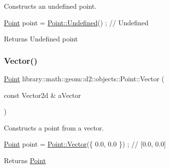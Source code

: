 Constructs an undefined point. 


\begin{DoxyCode}
\hyperlink{classlibrary_1_1math_1_1geom_1_1d2_1_1objects_1_1_point_a4998aefdf80bdfd967f21d49fa050398}{Point} point = \hyperlink{classlibrary_1_1math_1_1geom_1_1d2_1_1objects_1_1_point_a110a5bba9399abc5408f6c34306040c6}{Point::Undefined}() ; \textcolor{comment}{// Undefined}
\end{DoxyCode}


\begin{DoxyReturn}{Returns}
Undefined point 
\end{DoxyReturn}
\mbox{\label{classlibrary_1_1math_1_1geom_1_1d2_1_1objects_1_1_point_a3b656a68cb1f75901dc44e109e6eca58}} 
\subsubsection{\texorpdfstring{Vector()}{Vector()}}
{\footnotesize\ttfamily \hyperlink{classlibrary_1_1math_1_1geom_1_1d2_1_1objects_1_1_point}{Point} library\+::math\+::geom\+::d2\+::objects\+::\+Point\+::\+Vector (\begin{DoxyParamCaption}\item[{const Vector2d \&}]{a\+Vector }\end{DoxyParamCaption})\hspace{0.3cm}{\ttfamily [static]}}



Constructs a point from a vector. 


\begin{DoxyCode}
\hyperlink{classlibrary_1_1math_1_1geom_1_1d2_1_1objects_1_1_point_a4998aefdf80bdfd967f21d49fa050398}{Point} point = \hyperlink{classlibrary_1_1math_1_1geom_1_1d2_1_1objects_1_1_point_a3b656a68cb1f75901dc44e109e6eca58}{Point::Vector}(\{ 0.0, 0.0 \}) ; \textcolor{comment}{// [0.0, 0.0]}
\end{DoxyCode}


\begin{DoxyReturn}{Returns}
\hyperlink{classlibrary_1_1math_1_1geom_1_1d2_1_1objects_1_1_point}{Point} 
\end{DoxyReturn}
\mbox{\label{classlibrary_1_1math_1_1geom_1_1d2_1_1objects_1_1_point_abaaa09e58c97324a44e9d60bcad63171}} 
